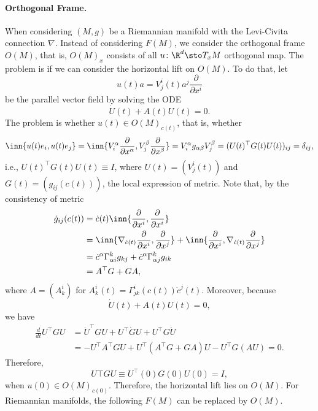 \paragraph{Orthogonal Frame.} When considering $(M,g)$ be a Riemannian manifold with the Levi-Civita connection $\nabla$. Instead of considering $F(M)$, we consider the orthogonal frame $O(M)$, that is, $O(M)_x$ consists of all $u \colon \R^d \sto T_xM$ orthogonal map. The problem is if we can consider the horizontal lift on $O(M)$. To do that, let
\begin{equation*}
    u(t)a = V^i_j(t)a^j \frac{\partial}{\partial x^i}
\end{equation*}
be the parallel vector field by solving the ODE
\begin{equation*}
    \dot{U}(t) + A(t)U(t) = 0.
\end{equation*}
The problem is whether $u(t) \in O(M)_{c(t)}$, that is, whether
\begin{equation*}
    \inn{u(t)e_i,u(t)e_j} = \inn{V^\alpha_i\frac{\partial}{\partial x^\alpha},V^\beta_j\frac{\partial}{\partial x^\beta}} = V^\alpha_ig_{\alpha\beta}V^\beta_j = (U(t)^\top G(t)U(t))_{ij} = \delta_{ij},
\end{equation*}
i.e., $U(t)^\top G(t)U(t) \equiv I$, where $U(t) = (V^i_j(t))$ and $G(t) = (g_{ij}(c(t)))$, the local expression of metric. Note that, by the consistency of metric
\begin{align*}
    \dot{g}_{ij}(c(t)) &= \dot{c}(t) \inn{\frac{\partial}{\partial x^i},\frac{\partial}{\partial x^i}} \\
    &= \inn{\nabla_{\dot{c}(t)}\frac{\partial}{\partial x^i},\frac{\partial}{\partial x^j}} + \inn{\frac{\partial}{\partial x^i},\nabla_{\dot{c}(t)}\frac{\partial}{\partial x^j}} \\
    &=\dot{c}^\alpha \Gamma^k_{\alpha i}g_{kj} + \dot{c}^\alpha \Gamma^k_{\alpha j}g_{ik} \\
    &= A^\top G + GA,
\end{align*}
where $A = (A^i_k)$ for $A^i_k(t) = \Gamma^i_{jk}(c(t))\dot{c}^j(t)$. Moreover, because
\begin{equation*}
    \dot{U}(t) + A(t)U(t) = 0,
\end{equation*}
we have
\begin{align*}
    \frac{d}{dt}U^\top GU &= \dot{U}^{\top} G U+U^{\top} \dot{G} U+U^{\top} G \dot{U}\\
    &= -U^\top A^\top G U + U^\top(A^\top G + GA) U - U^{\top} G(AU) = 0.
\end{align*}
Therefore,
\begin{equation*}
    U\top GU \equiv U^{\top}(0) G(0)U(0) = I,
\end{equation*}
when $u(0) \in O(M)_{c(0)}$. Therefore, the horizontal lift lies on $O(M)$. For Riemannian manifolds, the following $F(M)$ can be replaced by $O(M)$.

